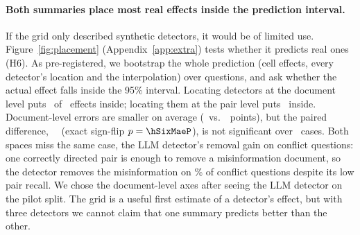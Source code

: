 \paragraph{Both summaries place most real effects inside the prediction interval.}
If the grid only described synthetic detectors, it would be of limited use. Figure~\ref{fig:placement} (Appendix~\ref{app:extra}) tests
whether it predicts real ones (H6). As pre-registered, we bootstrap the whole prediction (cell effects, every detector's
location and the interpolation) over questions, and ask whether the actual effect falls inside the 95\% interval.
Locating detectors at the document level puts \hSixDocIn\ of \hSixN\ effects inside; locating them at the pair
level puts \hSixPairIn\ inside. Document-level errors are smaller on
average (\hSixDocMae\ vs.\ \hSixPairMae\ points), but the paired difference, \hSixMaeDiff\ \hSixMaeDiffCI\ (exact
sign-flip $p=\hSixMaeP$), is not significant over \hSixN\ cases. Both spaces miss the same case, the LLM detector's
removal gain on conflict questions: one correctly directed pair is enough to remove a misinformation document, so the
detector removes the misinformation on \misGoneLlm\% of conflict questions despite its low pair recall. We chose the
document-level axes after seeing the LLM detector on the pilot split. The grid is a useful first estimate of a
detector's effect, but with three detectors we cannot claim that one summary predicts better than the other.

